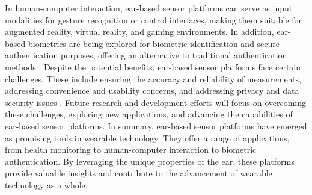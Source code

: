 In human-computer interaction, ear-based sensor platforms can serve as input modalities for gesture recognition or control interfaces, making them suitable for augmented reality, virtual reality, and gaming environments. 
In addition, ear-based biometrics are being explored for biometric identification and secure authentication purposes, offering an alternative to traditional authentication methods \cite{roddigerSensingEarablesSystematic2022a}.
Despite the potential benefits, ear-based sensor platforms face certain challenges. 
These include ensuring the accuracy and reliability of measurements, addressing convenience and usability concerns, and addressing privacy and data security issues \cite{bockAccuracyNewInfrared2005, roddigerRespirationRateMonitoring2020, bonziAccuracyPeripheralThermometers2016, gasimAccuracyTympanicTemperature2013, amoateng-adjepongAccuracyInfraredTympanic1999a, ericksonComparisonEarbasedBladder1993, chagllae.MeasurementCoreBody2018}. 
Future research and development efforts will focus on overcoming these challenges, exploring new applications, and advancing the capabilities of ear-based sensor platforms.
In summary, ear-based sensor platforms have emerged as promising tools in wearable technology. 
They offer a range of applications, from health monitoring to human-computer interaction to biometric authentication. 
By leveraging the unique properties of the ear, these platforms provide valuable insights and contribute to the advancement of wearable technology as a whole.

